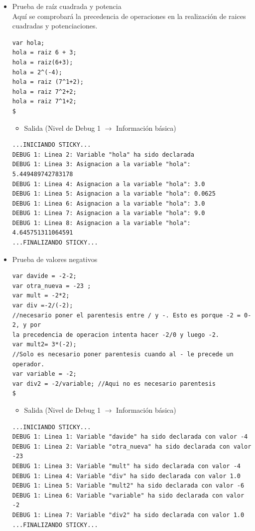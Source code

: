 \documentclass[a4paper, 12pt]{book}
\begin{document}
\begin{itemize}
\item Prueba de raíz cuadrada y potencia\\

  
  Aquí se comprobará la precedencia de operaciones en la realización de raices cuadradas y potenciaciones. \\
  
  
\begin{verbatim}
var hola; 
hola = raiz 6 + 3;
hola = raiz(6+3);
hola = 2^(-4);
hola = raiz (7^1+2);
hola = raiz 7^2+2;
hola = raiz 7^1+2;
$
\end{verbatim}
  
  

  \begin{itemize}
  \item Salida (Nivel de Debug 1 $\rightarrow$ Información básica)
  \end{itemize}
\begin{verbatim}
...INICIANDO STICKY...
DEBUG 1: Linea 2: Variable "hola" ha sido declarada
DEBUG 1: Linea 3: Asignacion a la variable "hola": 5.449489742783178
DEBUG 1: Linea 4: Asignacion a la variable "hola": 3.0
DEBUG 1: Linea 5: Asignacion a la variable "hola": 0.0625
DEBUG 1: Linea 6: Asignacion a la variable "hola": 3.0
DEBUG 1: Linea 7: Asignacion a la variable "hola": 9.0
DEBUG 1: Linea 8: Asignacion a la variable "hola": 4.645751311064591
...FINALIZANDO STICKY...
\end{verbatim}
  

  
  
\item Prueba de valores negativos\\
  
  
  
\begin{verbatim}
var davide = -2-2;
var otra_nueva = -23 ;
var mult = -2*2;
var div =-2/(-2); 
//necesario poner el parentesis entre / y -. Esto es porque -2 = 0-2, y por 
la precedencia de operacion intenta hacer -2/0 y luego -2.
var mult2= 3*(-2); 
//Solo es necesario poner parentesis cuando al - le precede un operador.
var variable = -2;
var div2 = -2/variable; //Aqui no es necesario parentesis
$
\end{verbatim}
  
  
  
  \begin{itemize}
  \item Salida (Nivel de Debug 1 $\rightarrow$ Información básica)
\end{itemize}
\begin{verbatim}
...INICIANDO STICKY...
DEBUG 1: Linea 1: Variable "davide" ha sido declarada con valor -4
DEBUG 1: Linea 2: Variable "otra_nueva" ha sido declarada con valor -23
DEBUG 1: Linea 3: Variable "mult" ha sido declarada con valor -4
DEBUG 1: Linea 4: Variable "div" ha sido declarada con valor 1.0
DEBUG 1: Linea 5: Variable "mult2" ha sido declarada con valor -6
DEBUG 1: Linea 6: Variable "variable" ha sido declarada con valor -2
DEBUG 1: Linea 7: Variable "div2" ha sido declarada con valor 1.0
...FINALIZANDO STICKY...
\end{verbatim}





\end{itemize}
\end{document}
